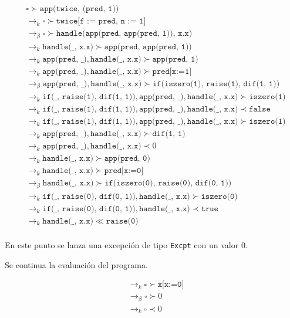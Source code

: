 \documentclass{article}
\newcommand{\tx}[1]{\texttt{#1}}
\newcommand{\ra}{\rightarrow}
\begin{document}
\begin{enumerate}
{\begin{itemize}
{			\begin{align*}
				&\square \succ \tx{app(twice, (pred, 1))} \\
				&\ra_k \square \succ \tx{twice[f := pred, n := 1]}\\
				&\ra_{\beta} \square \succ \tx{handle(app(pred, app(pred, 1)), x.x)} \\
				&\ra_k \tx{handle(\_, x.x)} \succ \tx{app(pred, app(pred, 1))} \\
				&\ra_k \tx{app(pred, \_)}, \tx{handle(\_, x.x)} \succ \tx{app(pred, 1)} \\
				&\ra_k \tx{app(pred, \_)}, \tx{handle(\_, x.x)} \succ \tx{pred[x:=1]} \\
				&\ra_{\beta} \tx{app(pred, \_)}, \tx{handle(\_, x.x)} \succ \tx{if(iszero(1), raise(1), dif(1, 1))} \\
				&\ra_k \tx{if(\_, raise(1), dif(1, 1))}, \tx{app(pred, \_)}, \tx{handle(\_, x.x)} \succ \tx{iszero(1)} \\
				&\ra_k \tx{if(\_, raise(1), dif(1, 1))}, \tx{app(pred, \_)}, \tx{handle(\_, x.x)} \prec \tx{false} \\
				&\ra_k \tx{if(\_, raise(1), dif(1, 1))}, \tx{app(pred, \_)}, \tx{handle(\_, x.x)} \succ \tx{iszero(1)} \\
				&\ra_k \tx{app(pred, \_)}, \tx{handle(\_, x.x)} \succ \tx{dif(1, 1)} \\
				&\ra_k \tx{app(pred, \_)}, \tx{handle(\_, x.x)} \prec 0 \\
				&\ra_k \tx{handle(\_, x.x)} \succ \tx{app(pred, 0)} \\
				&\ra_k \tx{handle(\_, x.x)} \succ \tx{pred[x:=0]} \\
				&\ra_{\beta} \tx{handle(\_, x.x)} \succ \tx{if(iszero(0), raise(0), dif(0, 1))} \\
				&\ra_k \tx{if(\_, raise(0), dif(0, 1))}, \tx{handle(\_, x.x)} \succ \tx{iszero(0)} \\
				&\ra_k \tx{if(\_, raise(0), dif(0, 1))}, \tx{handle(\_, x.x)} \prec \tx{true} \\
				&\ra_k \tx{handle(\_, x.x)} \ll \tx{raise(0)} \\
			\end{align*}

			En este punto se lanza una excepción de tipo \tx{Excpt} con un valor
			0.

			Se continua la evaluación del programa.

			\begin{align*}
				&\ra_k \square \succ \tx{x[x:=0]} \\
				&\ra_{\beta} \square \succ 0 \\
				&\ra_k \square \prec 0 \\
			\end{align*}
			}
		\end{itemize}
		
		}
	\end{enumerate}
\end{document}
